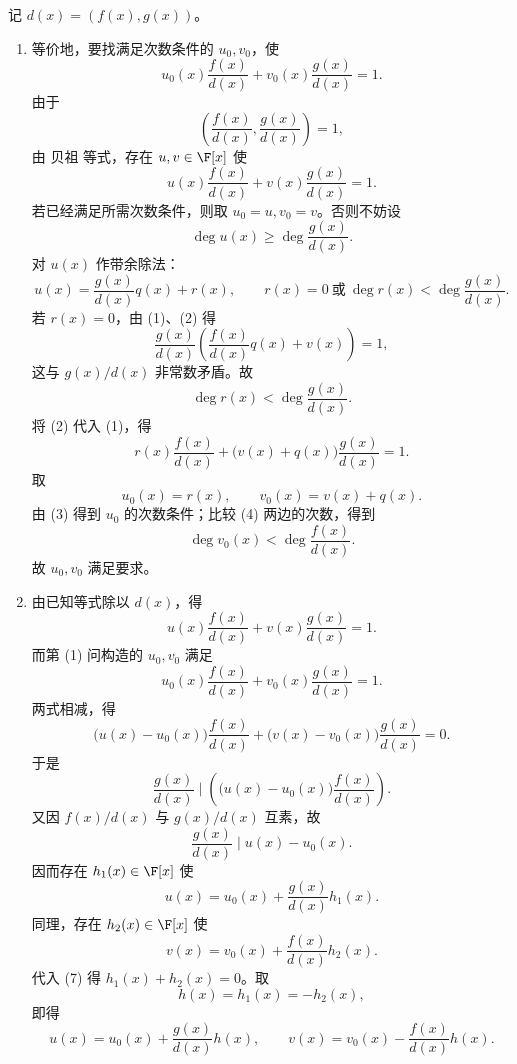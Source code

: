 \begin{solution}
记 \(d(x)=(f(x),g(x))\)。
	
	\begin{enumerate}
		\item 等价地，要找满足次数条件的 \(u_0,v_0\)，使
		\begin{equation}
			u_0(x)\frac{f(x)}{d(x)}+v_0(x)\frac{g(x)}{d(x)}=1.
			\tag{$*$}
		\end{equation}
		由于
		\[
		\left(\frac{f(x)}{d(x)},\frac{g(x)}{d(x)}\right)=1,
		\]
		由 贝祖 等式，存在 \(u,v\in\F[x]\) 使
		\begin{equation}
			u(x)\frac{f(x)}{d(x)}+v(x)\frac{g(x)}{d(x)}=1.
			\tag{1}
		\end{equation}
		若已经满足所需次数条件，则取 \(u_0=u,v_0=v\)。否则不妨设
		\[
		\deg u(x)\ge\deg\frac{g(x)}{d(x)}.
		\]
		对 \(u(x)\) 作带余除法：
		\begin{equation}
			u(x)=\frac{g(x)}{d(x)}q(x)+r(x),
			\qquad r(x)=0\ \text{或}\ \deg r(x)<\deg\frac{g(x)}{d(x)}.
			\tag{2}
		\end{equation}
		若 \(r(x)=0\)，由 (1)、(2) 得
		\[
		\frac{g(x)}{d(x)}
		\left(\frac{f(x)}{d(x)}q(x)+v(x)\right)=1,
		\]
		这与 \(g(x)/d(x)\) 非常数矛盾。故
		\begin{equation}
			\deg r(x)<\deg\frac{g(x)}{d(x)}.
			\tag{3}
		\end{equation}
		将 (2) 代入 (1)，得
		\begin{equation}
			r(x)\frac{f(x)}{d(x)}+\bigl(v(x)+q(x)\bigr)\frac{g(x)}{d(x)}=1.
			\tag{4}
		\end{equation}
		取
		\[
		u_0(x)=r(x),
		\qquad v_0(x)=v(x)+q(x).
		\]
		由 (3) 得到 \(u_0\) 的次数条件；比较 (4) 两边的次数，得到
		\[
		\deg v_0(x)<\deg\frac{f(x)}{d(x)}.
		\]
		故 \(u_0,v_0\) 满足要求。
		
		\item 由已知等式除以 \(d(x)\)，得
		\begin{equation}
			u(x)\frac{f(x)}{d(x)}+v(x)\frac{g(x)}{d(x)}=1.
			\tag{5}
		\end{equation}
		而第 (1) 问构造的 \(u_0,v_0\) 满足
		\begin{equation}
			u_0(x)\frac{f(x)}{d(x)}+v_0(x)\frac{g(x)}{d(x)}=1.
			\tag{6}
		\end{equation}
		两式相减，得
		\begin{equation}
			\bigl(u(x)-u_0(x)\bigr)\frac{f(x)}{d(x)}
			+\bigl(v(x)-v_0(x)\bigr)\frac{g(x)}{d(x)}=0.
			\tag{7}
		\end{equation}
		于是
		\[
		\frac{g(x)}{d(x)}
		\mid
		\left(\bigl(u(x)-u_0(x)\bigr)\frac{f(x)}{d(x)}\right).
		\]
		又因 \(f(x)/d(x)\) 与 \(g(x)/d(x)\) 互素，故
		\[
		\frac{g(x)}{d(x)}\mid u(x)-u_0(x).
		\]
		因而存在 \(h_1(x)\in\F[x]\) 使
		\[
		u(x)=u_0(x)+\frac{g(x)}{d(x)}h_1(x).
		\]
		同理，存在 \(h_2(x)\in\F[x]\) 使
		\[
		v(x)=v_0(x)+\frac{f(x)}{d(x)}h_2(x).
		\]
		代入 (7) 得 \(h_1(x)+h_2(x)=0\)。取
		\[
		h(x)=h_1(x)=-h_2(x),
		\]
		即得
		\[
		u(x)=u_0(x)+\frac{g(x)}{d(x)}h(x),
		\qquad
		v(x)=v_0(x)-\frac{f(x)}{d(x)}h(x).
		\]
	\end{enumerate}
\end{solution}

